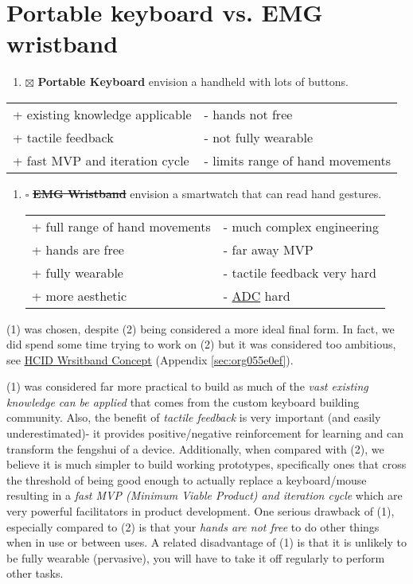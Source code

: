 \documentclass[logo,bsc,singlespacing,parskip]{infthesis}
\begin{document}
\section{Portable keyboard vs. EMG wristband}
\label{sec:org64d5eec}
\begin{enumerate}
\item{$\boxtimes$} \textbf{Portable Keyboard} envision a handheld with lots of buttons.
\end{enumerate}
\begin{longtable}{|p{6.25cm}|p{6.25cm}|}
\hline
+ existing knowledge applicable & - hands not free\\
+ tactile feedback & - not fully wearable\\
+ fast MVP and iteration cycle & - limits range of hand movements\\
\hline
\end{longtable}
\begin{enumerate}
\item{$\square$} \sout{\textbf{EMG Wristband}} envision a smartwatch that can read hand gestures.
\begin{longtable}{|p{6.25cm}|p{6.25cm}|}
\hline
+ full range of hand movements & - much complex engineering\\
+ hands are free & - far away MVP\\
+ fully wearable & - tactile feedback very hard\\
+ more aesthetic & - \hyperref[orge86f149]{ADC} hard\\
\hline
\end{longtable}
\end{enumerate}

(1) was chosen, despite (2) being considered a more ideal final form.
In fact, we did spend some time trying to work on (2) but it was considered too ambitious, see \hyperref[sec:org055e0ef]{HCID Wrsitband Concept} (Appendix \ref{sec:org055e0ef}).

(1) was considered far more practical to build as much of the \emph{vast existing knowledge can be applied} that comes from the custom keyboard building community.
Also, the benefit of \emph{tactile feedback} is very important (and easily underestimated)- it provides positive/negative reinforcement for learning and can transform the fengshui of a device.
Additionally, when compared with (2), we believe it is much simpler to build working prototypes, specifically ones that cross the threshold of being good enough to actually replace a keyboard/mouse resulting in a \emph{fast MVP (Minimum Viable Product) and iteration cycle} which are very powerful facilitators in product development.
One serious drawback of (1), especially compared to (2) is that your \emph{hands are not free} to do other things when in use or between uses. A related disadvantage of (1) is that it is unlikely to be fully wearable (pervasive), you will have to take it off regularly to perform other tasks.
\end{document}
